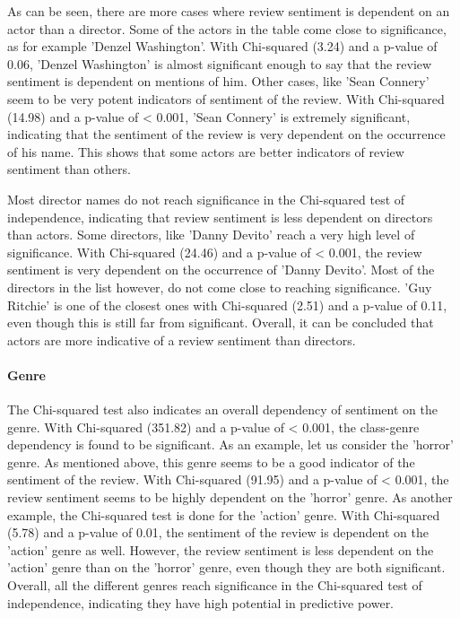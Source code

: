 \documentclass[
10pt, %
a4paper, %
oneside, %
headinclude,footinclude, %
] {book}%
\begin{document}
As can be seen, there are more cases where review sentiment is dependent on an actor than a director. Some of the actors in the table come close to significance, as for example 'Denzel Washington'. With Chi-squared (3.24) and a p-value of 0.06, 'Denzel Washington' is almost significant enough to say that the review sentiment is dependent on mentions of him. Other cases, like 'Sean Connery' seem to be very potent indicators of sentiment of the review. With Chi-squared (14.98) and a p-value of < 0.001, 'Sean Connery' is extremely significant, indicating that the sentiment of the review is very dependent on the occurrence of his name. This shows that some actors are better indicators of review sentiment than others.

Most director names do not reach significance in the Chi-squared test of independence, indicating that review sentiment is less dependent on directors than actors.  Some directors, like 'Danny Devito' reach a very high level of significance. With Chi-squared (24.46) and a p-value of < 0.001, the review sentiment is very dependent on the occurrence of 'Danny Devito'. Most of the directors in the list however, do not come close to reaching significance. 'Guy Ritchie' is one of the closest ones with Chi-squared (2.51) and a p-value of 0.11, even though this is still far from significant. Overall, it can be concluded that actors are more indicative of a review sentiment than directors.

\paragraph{Genre}

The Chi-squared test also indicates an overall dependency of sentiment on the genre. With Chi-squared (351.82) and a p-value of < 0.001, the class-genre dependency is found to be significant. As an example, let us consider the 'horror' genre. As mentioned above, this genre seems to be a good indicator of the sentiment of the review. With Chi-squared (91.95) and a p-value of < 0.001, the review sentiment seems to be highly dependent on the 'horror' genre. As another example, the Chi-squared test is done for the 'action' genre. With Chi-squared (5.78) and a p-value of 0.01, the sentiment of the review is dependent on the 'action' genre as well. However, the review sentiment is less dependent on the 'action' genre than on the 'horror' genre, even though they are both significant. Overall, all the different genres reach significance in the Chi-squared test of independence, indicating they have high potential in predictive power.
\end{document}
